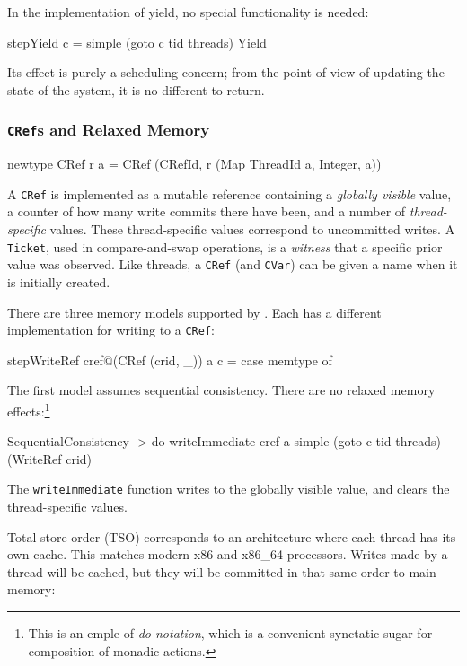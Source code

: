 In the implementation of yield, no special functionality is needed:

\begin{haskellcode}
stepYield c = simple (goto c tid threads) Yield
\end{haskellcode}

Its effect is purely a scheduling concern; from the point of view of
updating the state of the system, it is no different to return.

\subsubsection{\texttt{CRef}s and Relaxed Memory}
\label{sec:execution-stepwise-cref}

\begin{haskellcode}
newtype CRef r a = CRef (CRefId, r (Map ThreadId a, Integer, a))
\end{haskellcode}

A \verb|CRef| is implemented as a mutable reference containing a
\emph{globally visible} value, a counter of how many write commits
there have been, and a number of \emph{thread-specific} values. These
thread-specific values correspond to uncommitted writes. A
\verb|Ticket|, used in compare-and-swap operations, is a
\emph{witness} that a specific prior value was observed. Like threads,
a \verb|CRef| (and \verb|CVar|) can be given a name when it is
initially created.

There are three memory models supported by \dejafu{}. Each has a
different implementation for writing to a \verb|CRef|:

\begin{haskellcode}
stepWriteRef cref@(CRef (crid, _)) a c = case memtype of
\end{haskellcode}

The first model assumes sequential consistency. There are no relaxed
memory effects:\footnote{This is an emple of \emph{do notation}, which
  is a convenient synctatic sugar for composition of monadic actions.}

\begin{haskellcode}
  SequentialConsistency -> do
    writeImmediate cref a
    simple (goto c tid threads) (WriteRef crid)
\end{haskellcode}

The \verb|writeImmediate| function writes to the globally visible
value, and clears the thread-specific values.

Total store order (TSO) corresponds to an architecture where each
thread has its own cache. This matches modern x86 and x86\_64
processors. Writes made by a thread will be cached, but they will be
committed in that same order to main memory:

